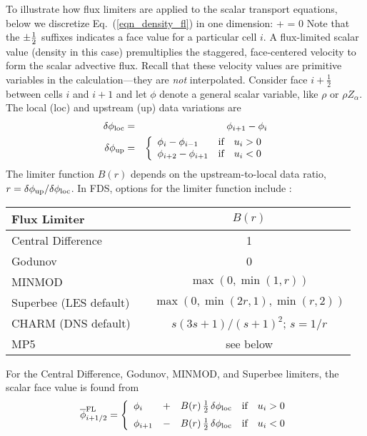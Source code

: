 To illustrate how flux limiters are applied to the scalar transport equations, below we discretize Eq.~(\ref{eqn_density_fl}) in one dimension:
\be  {}
    +  = 0
\ee
Note that the $\pm\frac{1}{2}$ suffixes indicates a face value for a particular cell $i$. A flux-limited scalar value (density in this case) premultiplies the staggered, face-centered velocity to form the scalar advective flux.  Recall that these velocity values are primitive variables in the calculation---they are \emph{not} interpolated.
Consider face $i+\frac{1}{2}$ between cells $i$ and $i+1$ and let $\phi$ denote a general scalar variable, like $\rho$ or $\rho Z_\alpha$.  The local (loc) and upstream (up) data variations are
\begin{eqnarray}
\delta \phi_{\rm loc} &=& \phi_{i+1}-\phi_i \\
\delta \phi_{\rm up}  &=& \left\{ \begin{array}{ll} \phi_i-\phi_{i-1} & \mbox{if} \quad u_i>0 \\ \phi_{i+2}-\phi_{i+1} & \mbox{if} \quad u_i<0 \end{array} \right.
\end{eqnarray}
The limiter function $B(r)$ depends on the upstream-to-local data ratio, $r=\delta \phi_{\rm up}/\delta \phi_{\rm loc}$. In FDS, options for the limiter function include \cite{Toro}:
\begin{table}[H]
\begin{center}
\begin{tabular}{lcc}
Flux Limiter          && $B(r)$ \\
\hline
Central Difference       && 1      \\
Godunov                  && 0      \\
MINMOD                   && $\max(0,\min(1,r))$ \\
Superbee \cite{Roe:1986} (LES default) && $\max(0,\min(2r,1),\min(r,2))$ \\
CHARM \cite{Zhou:1995} (DNS default)   && $s(3s+1)/(s+1)^2$; $s=1/r$ \\
MP5 \cite{Suresh:1997}   && see below
\end{tabular}
\end{center}
\end{table}
\noindent For the Central Difference, Godunov, MINMOD, and Superbee limiters, the scalar face value is found from
\begin{equation}
\label{eqn_flux_limiter}
\overline{\phi}^{\rm FL}_{i+1/2} = \left\{ \begin{array}{lcll} \phi_i &+& B(r) \,\frac{1}{2} \,\delta \phi_{\rm loc} & \mbox{if} \quad u_i>0 \vspace{0.2 cm}\\
\phi_{i+1} &-& B(r) \,\frac{1}{2} \,\delta \phi_{\rm loc} & \mbox{if} \quad u_i<0 \end{array} \right.
\end{equation}
